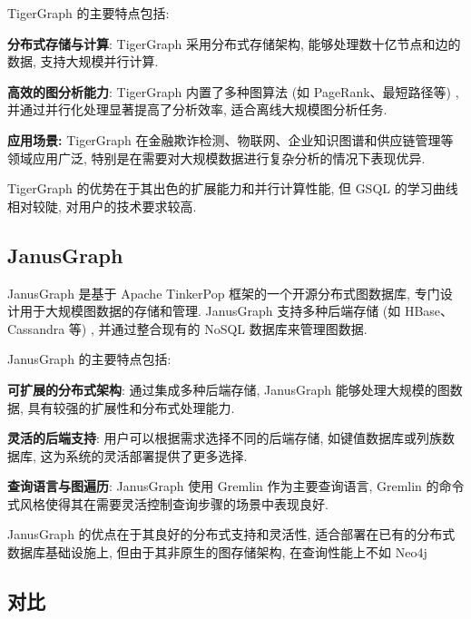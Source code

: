 \documentclass[12pt,hyperref,a4paper,UTF8]{ctexart}
\begin{document}
TigerGraph 的主要特点包括:

\textbf{分布式存储与计算}: TigerGraph 采用分布式存储架构, 能够处理数十亿节点和边的数据, 支持大规模并行计算.

\textbf{高效的图分析能力}: TigerGraph 内置了多种图算法 (如 PageRank、最短路径等) , 并通过并行化处理显著提高了分析效率, 适合离线大规模图分析任务.

\textbf{应用场景:} TigerGraph 在金融欺诈检测、物联网、企业知识图谱和供应链管理等领域应用广泛, 特别是在需要对大规模数据进行复杂分析的情况下表现优异.

TigerGraph 的优势在于其出色的扩展能力和并行计算性能, 但 GSQL 的学习曲线相对较陡, 对用户的技术要求较高.

\subsection{JanusGraph}

JanusGraph 是基于 Apache TinkerPop 框架的一个开源分布式图数据库, 专门设计用于大规模图数据的存储和管理. JanusGraph 支持多种后端存储 (如 HBase、Cassandra 等) , 并通过整合现有的 NoSQL 数据库来管理图数据.

JanusGraph 的主要特点包括:

\textbf{可扩展的分布式架构}: 通过集成多种后端存储, JanusGraph 能够处理大规模的图数据, 具有较强的扩展性和分布式处理能力.

\textbf{灵活的后端支持}: 用户可以根据需求选择不同的后端存储, 如键值数据库或列族数据库, 这为系统的灵活部署提供了更多选择.

\textbf{查询语言与图遍历}: JanusGraph 使用 Gremlin 作为主要查询语言, Gremlin 的命令式风格使得其在需要灵活控制查询步骤的场景中表现良好.

JanusGraph 的优点在于其良好的分布式支持和灵活性, 适合部署在已有的分布式数据库基础设施上, 但由于其非原生的图存储架构, 在查询性能上不如 Neo4j

\subsection{对比}
\end{document}
